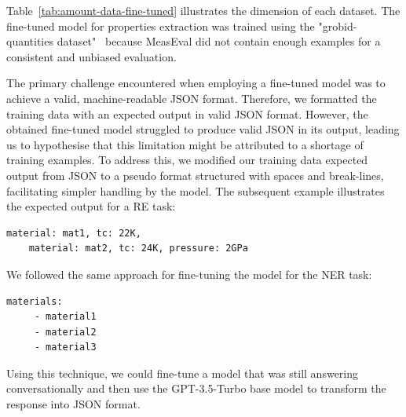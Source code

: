 Table~\ref{tab:amount-data-fine-tuned} illustrates the dimension of each dataset. 
The fine-tuned model for properties extraction was trained using the "grobid-quantities dataset"~\cite{foppiano2019quantities} because MeasEval did not contain enough examples for a consistent and unbiased evaluation. 


The primary challenge encountered when employing a fine-tuned model was to achieve a valid, machine-readable JSON format. 
Therefore, we formatted the training data with an expected output in valid JSON format. 
However, the obtained fine-tuned model struggled to produce valid JSON in its output, leading us to hypothesise that this limitation might be attributed to a shortage of training examples. 
To address this, we modified our training data expected output from JSON to a pseudo format structured with spaces and break-lines, facilitating simpler handling by the model. The subsequent example illustrates the expected output for a RE task:

\begin{lstlisting}[caption=Example format of the expected answer for the RE task]
    material: mat1, tc: 22K, 
    material: mat2, tc: 24K, pressure: 2GPa
\end{lstlisting}

We followed the same approach for fine-tuning the model for the NER task: 

\begin{lstlisting}[caption=Example format of the expected answer for the NER task]
    materials: 
     - material1
     - material2
     - material3
\end{lstlisting}

Using this technique, we could fine-tune a model that was still answering conversationally and then use the GPT-3.5-Turbo base model to transform the response into JSON format. 

